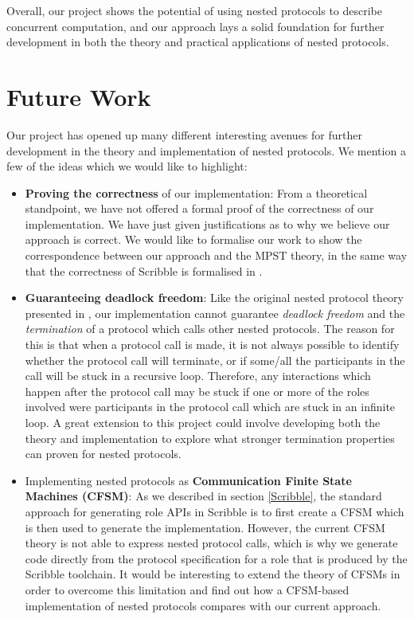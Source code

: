 \documentclass[12pt,twoside]{report}
\begin{document}
Overall, our project shows the potential of using nested protocols to describe concurrent computation, and our approach lays a solid foundation for further development in both the theory and practical applications of nested protocols.

\section{Future Work}
Our project has opened up many different interesting avenues for further development in the theory and implementation of nested protocols. We mention a few of the ideas which we would like to highlight:
\begin{itemize}
    \item \textbf{Proving the correctness} of our implementation: From a theoretical standpoint, we have not offered a formal proof of the correctness of our implementation. We have just given justifications as to why we believe our approach is correct. We would like to formalise our work to show the correspondence between our approach and the MPST theory, in the same way that the correctness of Scribble is formalised in \cite{featherweight}.
    \item \textbf{Guaranteeing deadlock freedom}: Like the original nested protocol theory presented in \cite{nestedprotocols}, our implementation cannot guarantee \textit{deadlock freedom} and the \textit{termination} of a protocol which calls other nested protocols. The reason for this is that when a protocol call is made, it is not always possible to identify whether the protocol call will terminate, or if some/all the participants in the call will be stuck in a recursive loop. Therefore, any interactions which happen after the protocol call may be stuck if one or more of the roles involved were participants in the protocol call which are stuck in an infinite loop. A great extension to this project could involve developing both the theory and implementation to explore what stronger termination properties can proven for nested protocols.
    \item Implementing nested protocols as \textbf{Communication Finite State Machines (CFSM)}: As we described in section \ref{Scribble}, the standard approach for generating role APIs in Scribble is to first create a CFSM which is then used to generate the implementation. However, the current CFSM theory is not able to express nested protocol calls, which is why we generate code directly from the protocol specification for a role that is produced by the Scribble toolchain. It would be interesting to extend the theory of CFSMs in order to overcome this limitation and find out how a CFSM-based implementation of nested protocols compares with our current approach.

\end{itemize}
\end{document}
